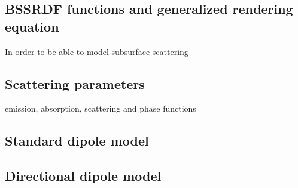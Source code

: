 \subsection{BSSRDF functions and generalized rendering equation}

In order to be able to model subsurface scattering 

\subsection{Scattering parameters}
 emission, absorption, scattering and phase functions
\subsection{Standard dipole model}
\subsection{Directional dipole model}
